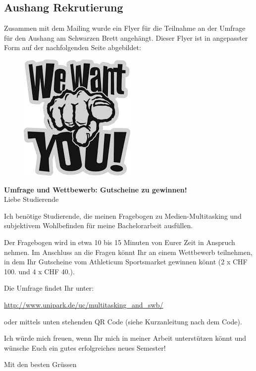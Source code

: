 \begin{RaggedRight}
\section*{Aushang Rekrutierung}\label{appendix.aushang}
Zusammen mit dem Mailing wurde ein Flyer für die Teilnahme an der Umfrage für den Aushang am Schwarzen Brett angehängt. Dieser Flyer ist in angepasster Form auf der nachfolgenden Seite abgebildet: \newpage
\begin{figure}[h]
    \centering
    \includegraphics[scale=0.5]{images/anhang/WeWantYou.jpeg}
\end{figure}
\textbf{Umfrage und Wettbewerb: Gutscheine zu gewinnen!}\\
Liebe Studierende

Ich benötige Studierende, die meinen Fragebogen zu Medien-Multitasking und subjektivem Wohlbefinden für meine Bachelorarbeit ausfüllen.

Der Fragebogen wird in etwa 10 bis 15 Minuten von Eurer Zeit in Anspruch nehmen. Im Anschluss an die Fragen könnt Ihr an einem Wettbewerb teilnehmen, in dem Ihr Gutscheine vom Athleticum Sportsmarket gewinnen könnt (2 x CHF 100.­ und 4 x CHF 40.­).

Die Umfrage findet Ihr unter:

\url{http://www.unipark.de/uc/multitasking_and_swb/}

oder mittels unten stehenden QR Code (siehe Kurzanleitung nach dem Code).

Ich würde mich freuen, wenn Ihr mich in meiner Arbeit unterstützen könnt und wünsche Euch ein gutes erfolgreiches neues Semester!

Mit den besten Grüssen


\end{RaggedRight}

